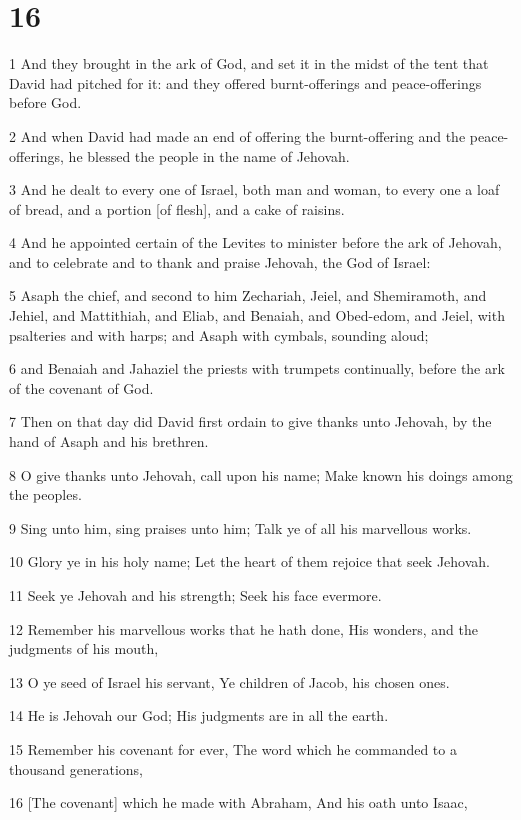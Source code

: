 \chapter{16}

\par 1 And they brought in the ark of God, and set it in the midst of the tent that David had pitched for it: and they offered burnt-offerings and peace-offerings before God.
\par 2 And when David had made an end of offering the burnt-offering and the peace-offerings, he blessed the people in the name of Jehovah.
\par 3 And he dealt to every one of Israel, both man and woman, to every one a loaf of bread, and a portion [of flesh], and a cake of raisins.
\par 4 And he appointed certain of the Levites to minister before the ark of Jehovah, and to celebrate and to thank and praise Jehovah, the God of Israel:
\par 5 Asaph the chief, and second to him Zechariah, Jeiel, and Shemiramoth, and Jehiel, and Mattithiah, and Eliab, and Benaiah, and Obed-edom, and Jeiel, with psalteries and with harps; and Asaph with cymbals, sounding aloud;
\par 6 and Benaiah and Jahaziel the priests with trumpets continually, before the ark of the covenant of God.
\par 7 Then on that day did David first ordain to give thanks unto Jehovah, by the hand of Asaph and his brethren.
\par 8 O give thanks unto Jehovah, call upon his name; Make known his doings among the peoples.
\par 9 Sing unto him, sing praises unto him; Talk ye of all his marvellous works.
\par 10 Glory ye in his holy name; Let the heart of them rejoice that seek Jehovah.
\par 11 Seek ye Jehovah and his strength; Seek his face evermore.
\par 12 Remember his marvellous works that he hath done, His wonders, and the judgments of his mouth,
\par 13 O ye seed of Israel his servant, Ye children of Jacob, his chosen ones.
\par 14 He is Jehovah our God; His judgments are in all the earth.
\par 15 Remember his covenant for ever, The word which he commanded to a thousand generations,
\par 16 [The covenant] which he made with Abraham, And his oath unto Isaac,
